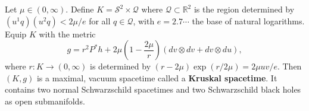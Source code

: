 Let $\mu \in (0, \infty)$. Define $K = \mathcal{S}^2 \times \mathcal{Q}$ where $\mathcal{Q} \subset \mathbb{R}^2$ is the region determined by $(u^1 q)(u^2 q) < 2\mu/e$ for all $q \in \mathcal{Q}$, with $e = 2.7\cdots$ the base of natural logarithms. Equip $K$ with the metric
$$g = r^2 P^* h + 2\mu\left(1 - \frac{2\mu}{r}\right)(dv \otimes dv + dv \otimes du),$$
where $r: K \to (0, \infty)$ is determined by $(r - 2\mu)\exp(r/2\mu) = 2\mu uv/e$. Then $(K, g)$ is a maximal, vacuum spacetime called a \textbf{Kruskal spacetime}. It contains two normal Schwarzschild spacetimes and two Schwarzschild black holes as open submanifolds.
